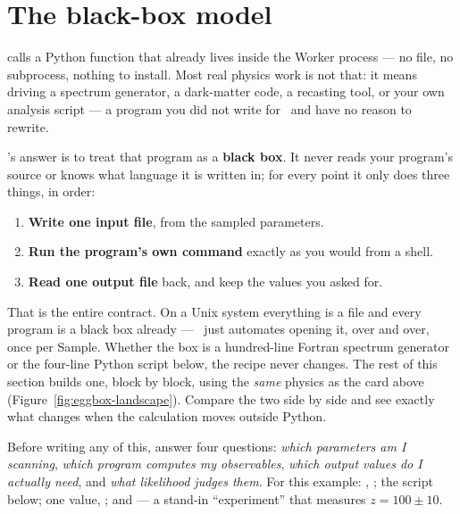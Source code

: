 \section{The black-box model}
\label{sec:quickstart-blackbox}

  calls a
Python function that already lives inside the Worker process --- no file, no
subprocess, nothing to install. Most real physics work is not that: it means driving a
spectrum generator, a dark-matter code, a recasting tool, or your own analysis script
--- a program you did not write for \Jtwo\ and have no reason to rewrite.

\Jtwo's answer is to treat that program as a \textbf{black box}. It never reads your
program's source or knows what language it is written in; for every point it only
does three things, in order:

\begin{enumerate}
  \item \textbf{Write one input file}, from the sampled parameters.
  \item \textbf{Run the program's own command} exactly as you would from a shell.
  \item \textbf{Read one output file} back, and keep the values you asked for.
\end{enumerate}

That is the entire contract. On a Unix system everything is a file and every program
is a black box already --- \Jtwo\ just automates opening it, over and over, once per
Sample. Whether the box is a hundred-line Fortran spectrum generator or the four-line
Python script below, the recipe never changes. The rest of this section builds one,
block by block, using the \emph{same}  physics as
the card above (Figure~\ref{fig:eggbox-landscape}). Compare the two side by side and
see exactly what changes when the calculation moves outside Python.

\begin{jtip}
Before writing any of this, answer four questions: \emph{which parameters am I
scanning}, \emph{which program computes my observables}, \emph{which output values do
I actually need}, and \emph{what likelihood judges them}. For this example: ,
; the  script below; one value, ; and
 --- a stand-in ``experiment'' that measures
$z = 100 \pm 10$.
\end{jtip}

